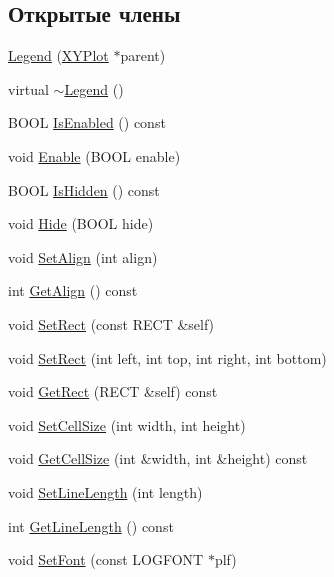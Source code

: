 \subsection*{Открытые члены}
\begin{DoxyCompactItemize}
\item 
\hyperlink{class_legend_a4f7f9fbc734a17fcec1aac7d1a8fadd1}{Legend} (\hyperlink{class_x_y_plot}{X\-Y\-Plot} $\ast$parent)
\item 
virtual \hyperlink{class_legend_a115704c32c3ebb783c3ebdd9b2d42f94}{$\sim$\-Legend} ()
\item 
B\-O\-O\-L \hyperlink{class_legend_a0897a355c053f7f6cdf1402e3efc47db}{Is\-Enabled} () const 
\item 
void \hyperlink{class_legend_a54ddf99906fffb8c980460a2b83af3b3}{Enable} (B\-O\-O\-L enable)
\item 
B\-O\-O\-L \hyperlink{class_legend_ad9203ba4dd99cff8f06bfe67a83d177b}{Is\-Hidden} () const 
\item 
void \hyperlink{class_legend_ac0d117f614faf8abc3a0c6662298e331}{Hide} (B\-O\-O\-L hide)
\item 
void \hyperlink{class_legend_a1b6519b466a61a4c41b21c3bbf3d5143}{Set\-Align} (int align)
\item 
int \hyperlink{class_legend_a047bb7503a5efcca94fbf869b535979c}{Get\-Align} () const 
\item 
void \hyperlink{class_legend_a5c9f1626236b331c440ee630e32e2543}{Set\-Rect} (const R\-E\-C\-T \&self)
\item 
void \hyperlink{class_legend_a49b632e529f71ebc6ff9ed337eb46820}{Set\-Rect} (int left, int top, int right, int bottom)
\item 
void \hyperlink{class_legend_a1e5d3d80a9db05979396b7f7d8aaeb24}{Get\-Rect} (R\-E\-C\-T \&self) const 
\item 
void \hyperlink{class_legend_aaaac5b1cc325b70ed985b5e671219be2}{Set\-Cell\-Size} (int width, int height)
\item 
void \hyperlink{class_legend_aa85e5a1690d0b39faa1b93d67027c33d}{Get\-Cell\-Size} (int \&width, int \&height) const 
\item 
void \hyperlink{class_legend_a24fa9da3d1d681d0b668cdbe246852bf}{Set\-Line\-Length} (int length)
\item 
int \hyperlink{class_legend_ad2d3feab72270972696612a660c36c80}{Get\-Line\-Length} () const 
\item 
void \hyperlink{class_legend_a9f1846fd3945025e00c257b30eb83308}{Set\-Font} (const L\-O\-G\-F\-O\-N\-T $\ast$plf)
\item 

\end{DoxyCompactItemize}
